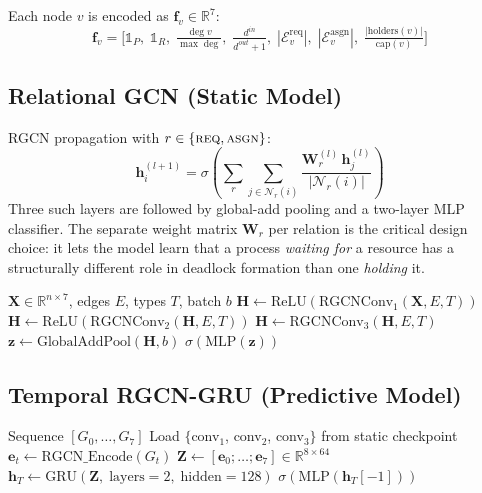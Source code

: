 \documentclass[conference]{IEEEtran}
\begin{document}
Each node $v$ is encoded as $\mathbf{f}_v \in \mathbb{R}^7$:
\begin{equation}
\mathbf{f}_v = \bigl[
  \mathbb{1}_P,\;
  \mathbb{1}_R,\;
  \tfrac{\deg v}{\max\!\deg},\;
  \tfrac{d^{in}}{d^{out}+1},\;
  |\mathcal{E}^{\text{req}}_v|,\;
  |\mathcal{E}^{\text{asgn}}_v|,\;
  \tfrac{|\text{holders}(v)|}{\text{cap}(v)}
\bigr]
\end{equation}

\subsection{Relational GCN (Static Model)}

RGCN propagation with $r \in \{\textsc{req}, \textsc{asgn}\}$:
\begin{equation}
\mathbf{h}_i^{(l+1)} = \sigma\!\left(
  \sum_r \sum_{j\in\mathcal{N}_r(i)}
  \frac{\mathbf{W}_r^{(l)}\,\mathbf{h}_j^{(l)}}{|\mathcal{N}_r(i)|}
\right)
\end{equation}
Three such layers are followed by global-add pooling and a two-layer MLP
classifier. The separate weight matrix $\mathbf{W}_r$ per relation is the
critical design choice: it lets the model learn that a process \emph{waiting
for} a resource has a structurally different role in deadlock formation than
one \emph{holding} it.

\begin{algorithm}[H]
\caption{RGCN Static Forward Pass}
\begin{algorithmic}[1]
\REQUIRE $\mathbf{X}\!\in\!\mathbb{R}^{n\times7}$, edges $E$, types $T$, batch $b$
\STATE $\mathbf{H} \leftarrow \text{ReLU}(\text{RGCNConv}_1(\mathbf{X},E,T))$
\STATE $\mathbf{H} \leftarrow \text{ReLU}(\text{RGCNConv}_2(\mathbf{H},E,T))$
\STATE $\mathbf{H} \leftarrow \text{RGCNConv}_3(\mathbf{H},E,T)$
\STATE $\mathbf{z} \leftarrow \text{GlobalAddPool}(\mathbf{H},b)$
\RETURN $\sigma(\text{MLP}(\mathbf{z}))$
\end{algorithmic}
\end{algorithm}

\subsection{Temporal RGCN-GRU (Predictive Model)}

\begin{algorithm}[H]
\caption{Temporal Forward Pass with Transfer Learning}
\begin{algorithmic}[1]
\REQUIRE Sequence $[G_0, \ldots, G_7]$
\STATE Load $\{$conv$_1$, conv$_2$, conv$_3\}$ from static checkpoint 
  \STATE $\mathbf{e}_t \leftarrow \text{RGCN\_Encode}(G_t)$ \quad{}
\ENDFOR
\STATE $\mathbf{Z} \leftarrow [\mathbf{e}_0;\ldots;\mathbf{e}_7]\in\mathbb{R}^{8\times64}$
\STATE $\mathbf{h}_T \leftarrow \text{GRU}(\mathbf{Z},\;\text{layers}=2,\;\text{hidden}=128)$
\RETURN $\sigma(\text{MLP}(\mathbf{h}_T[-1]))$ 
\end{algorithmic}
\end{algorithm}
\end{document}
